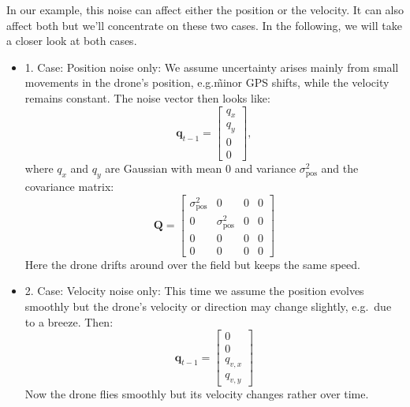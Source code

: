 \begin{example}
In our example, this noise can affect either the position or the velocity. It can also affect both but we'll concentrate on these two cases. In the following, we will take a closer look at both cases. 

\begin{itemize}
    \item{1. Case: Position noise only:} We assume uncertainty arises mainly from small movements in the drone's position, e.g.\~ minor GPS shifts, while the velocity remains constant. The noise vector then looks like:
    \[\mathbf{q}_{t-1} = \begin{bmatrix}
        q_x \\
        q_y \\
        0 \\
        0
    \end{bmatrix},\]
    where $q_x$ and $q_y$ are Gaussian with mean $0$ and variance $\sigma_\text{pos}^2$ and the covariance matrix: 
    \[\mathbf{Q}=\begin{bmatrix}
        \sigma_\text{pos}^2 & 0 & 0 & 0 \\
        0 & \sigma_\text{pos}^2 & 0 & 0 \\
        0 & 0 & 0 & 0 \\
        0 & 0 & 0 & 0 
    \end{bmatrix}\]
    Here the drone drifts around over the field but keeps the same speed. 
    
    \item{2. Case: Velocity noise only:} This time we assume the position evolves smoothly but the drone's velocity or direction may change slightly, e.g.~due to a breeze. Then:
    \[\mathbf{q}_{t-1}= \begin{bmatrix}
        0 \\
        0 \\
        q_{v,x} \\
        q_{v,y}
    \end{bmatrix}\]
    Now the drone flies smoothly but its velocity changes rather over time. 
\end{itemize}
\end{example}




